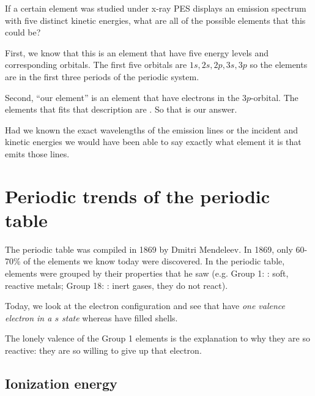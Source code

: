 \documentclass[../mit-general-chemistry.tex]{subfiles}
\begin{document}
\begin{example}
  If a certain element was studied under x-ray PES displays an
  emission spectrum with five distinct kinetic energies, what are all
  of the possible elements that this could be?

  First, we know that this is an element that have five energy levels
  and corresponding orbitals. The first five orbitals are $1s, 2s, 2p,
  3s, 3p$ so the elements are in the first three periods of the
  periodic system.

  Second, ``our element'' is an element that have electrons in the
  $3p$-orbital. The elements that fits that description are
  . So that is our answer.

  Had we known the exact wavelengths of the emission lines or the
  incident and kinetic energies we would have been able to say exactly
  what element it is that emits those lines.
\end{example}














\section{Periodic trends of the periodic table}



The periodic table was compiled in 1869 by Dmitri Mendeleev. In 1869,
only 60-70\% of the elements we know today were discovered. In the
periodic table, elements were grouped by their properties that he saw
(e.g. Group 1: : soft, reactive metals; Group 18:
: inert gases, they do not react).

Today, we look at the electron configuration and see that  have {\em one valence electron in a $s$ state} whereas  have filled shells.

The lonely valence of the Group 1 elements is the explanation to why
they are so reactive: they are so willing to give up that electron.



\subsection{Ionization energy}
\end{document}

